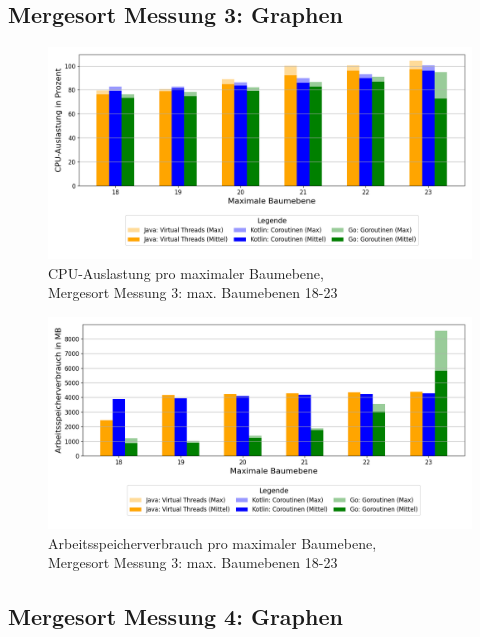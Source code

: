 \documentclass[fontsize=12pt,paper=a4,twoside=semi,parskip=half-,headsepline,headinclude]{scrreprt}
\begin{document}
\subsection{Mergesort Messung 3: Graphen}

\begin{figure}[H]
	\centering
	\includegraphics[scale=0.5]{figures/mergesort/Maximalebauebenen1-23_vcg/cpu_usage_bar_plot.png}
	\caption{CPU-Auslastung pro maximaler Baumebene,\\ Mergesort Messung 3: max. Baumebenen 18-23}
	\label{fig:ms1-23CPU}
\end{figure}

\begin{figure}[H]
	\centering
	\includegraphics[scale=0.5]{figures/mergesort/Maximalebauebenen1-23_vcg/memory_usage_bar_plot.png}
	\caption{Arbeitsspeicherverbrauch pro maximaler Baumebene,\\ Mergesort Messung 3: max. Baumebenen 18-23}
	\label{fig:ms1-23RAM}
\end{figure}

\subsection{Mergesort Messung 4: Graphen}
\label{subsec:mergsort4graph}
\end{document}
